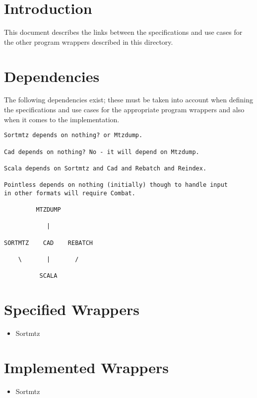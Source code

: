 \documentclass[a4paper, 11pt]{article}
\begin{document}
\section{Introduction}

This document describes the links between the specifications and use cases
for the other program wrappers described in this directory. 

\section{Dependencies}

The following dependencies exist; these must be taken into account when
defining the specifications and use cases for the appropriate program
wrappers and also when it comes to the implementation.

{
\tiny
\begin{verbatim}
Sortmtz depends on nothing? or Mtzdump.

Cad depends on nothing? No - it will depend on Mtzdump.

Scala depends on Sortmtz and Cad and Rebatch and Reindex.

Pointless depends on nothing (initially) though to handle input
in other formats will require Combat.

         MTZDUMP

            |

SORTMTZ    CAD    REBATCH

    \       |       /

          SCALA 
\end{verbatim}
}


\section{Specified Wrappers}

\begin{itemize}
\item{Sortmtz}
\end{itemize}


\section{Implemented Wrappers}

\begin{itemize}
\item{Sortmtz}
\end{itemize}
\end{document}
